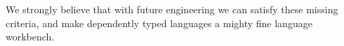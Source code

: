 We strongly believe that with future engineering we can satisfy these missing criteria,
and make dependently typed languages a mighty fine language workbench.


